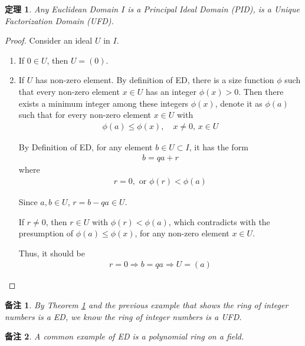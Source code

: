 \documentclass[utf8]{ctexbook}
\newtheorem{theorem}{定理}[section]
\newtheorem{memo}{备注}[section]
\begin{document}
\begin{theorem}
\label{theorem_ED_is_PID_is_UFD}
Any Euclidean Domain $I$ is a Principal Ideal Domain (PID), is a Unique Factorization Domain (UFD).
\end{theorem}

\begin{proof}
Consider an ideal $U$ in $I$.
\begin{enumerate}
\item{If $0 \in U$, then $U = (0)$.}
\item{If $U$ has non-zero element. By definition of ED, there is a size function $\phi$ such that every non-zero element $x \in U$ has an integer $\phi(x) > 0$. Then there exists a minimum integer among these integers $\phi(x)$, denote it as $\phi(a)$ such that for every non-zero element $x \in U$ with
\begin{align*}
\phi(a) \leq \phi(x), \quad x \neq 0, \, x \in U
\end{align*}

By Definition of ED, for any element $b \in U \subset I$, it has the form
\begin{align*}
b = q a + r 
\end{align*}
where 
\begin{align*}
r = 0, \mbox{ or } \phi(r) < \phi(a)
\end{align*}

Since $a, b \in U$, $r = b - q a \in U$.

If $r \neq 0$, then $r \in U$ with $\phi(r) < \phi(a)$, which contradicts with the presumption of $\phi(a) \leq \phi(x)$, for any non-zero element $x \in U$.

Thus, it should be
\begin{align*}
r = 0 \Longrightarrow b = q a \Longrightarrow U = (a)
\end{align*}

}
\end{enumerate}

\end{proof}

\begin{memo}
By Theorem \ref{theorem_ED_is_PID_is_UFD} and the previous example that shows the ring of integer numbers is a ED, we know the ring of integer numbers is a UFD.
\end{memo}

\begin{memo}
A common example of ED is a polynomial ring on a field.
\end{memo}
\end{document}
